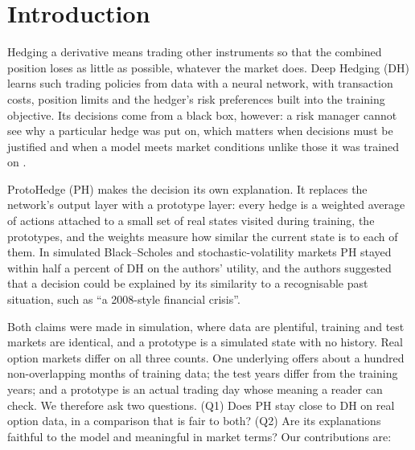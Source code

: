\documentclass[runningheads]{llncs}
\begin{document}
\section{Introduction}

Hedging a derivative means trading other instruments so that the combined position loses as little as
possible, whatever the market does. Deep Hedging (DH) \cite{buehler2019deep} learns such trading policies
from data with a neural network, with transaction costs, position limits and the hedger's risk preferences
built into the training objective. Its decisions come from a black box, however: a risk manager cannot see
why a particular hedge was put on, which matters when decisions must be justified and when a model meets
market conditions unlike those it was trained on \cite{rudin2019stop}.

ProtoHedge (PH) \cite{faloughi2025protohedge} makes the decision its own explanation. It replaces the
network's output layer with a prototype layer: every hedge is a weighted average of actions attached to a
small set of real states visited during training, the prototypes, and the weights measure how similar the
current state is to each of them. In simulated Black--Scholes and stochastic-volatility markets PH stayed
within half a percent of DH on the authors' utility, and the authors suggested that a decision could be
explained by its similarity to a recognisable past situation, such as ``a 2008-style financial crisis''.

Both claims were made in simulation, where data are plentiful, training and test markets are identical, and
a prototype is a simulated state with no history. Real option markets differ on all three counts. One
underlying offers about a hundred non-overlapping months of training data; the test years differ from the
training years; and a prototype is an actual trading day whose meaning a reader can check. We therefore ask
two questions. (Q1) Does PH stay close to DH on real option data, in a comparison that is fair to both?
(Q2) Are its explanations faithful to the model and meaningful in market terms? Our contributions are:
\end{document}
